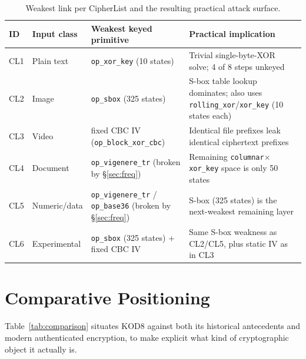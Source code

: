\documentclass[11pt]{article}
\begin{document}
\begin{table}[h]
\centering
\small
\caption{Weakest link per CipherList and the resulting practical attack surface.}
\label{tab:cl-summary}
\begin{tabular}{@{}p{1.1cm}p{3.0cm}p{4.6cm}p{4.8cm}@{}}
\toprule
\textbf{ID} & \textbf{Input class} & \textbf{Weakest keyed primitive} & \textbf{Practical implication} \\
\midrule
CL1 & Plain text & \texttt{op\_xor\_key} (10 states) & Trivial single-byte-XOR solve; 4 of 8 steps unkeyed \\
CL2 & Image & \texttt{op\_sbox} (325 states) & S-box table lookup dominates; also uses \texttt{rolling\_xor}/\texttt{xor\_key} (10 states each) \\
CL3 & Video & fixed CBC IV (\texttt{op\_block\_xor\_cbc}) & Identical file prefixes leak identical ciphertext prefixes \\
CL4 & Document & \texttt{op\_vigenere\_tr} (broken by \S\ref{sec:freq}) & Remaining \texttt{columnar}$\times$\texttt{xor\_key} space is only 50 states \\
CL5 & Numeric/data & \texttt{op\_vigenere\_tr} / \texttt{op\_base36} (broken by \S\ref{sec:freq}) & S-box (325 states) is the next-weakest remaining layer \\
CL6 & Experimental & \texttt{op\_sbox} (325 states) + fixed CBC IV & Same S-box weakness as CL2/CL5, plus static IV as in CL3 \\
\bottomrule
\end{tabular}
\end{table}

\section{Comparative Positioning}

Table~\ref{tab:comparison} situates KOD8 against both its historical
antecedents and modern authenticated encryption, to make explicit what
kind of cryptographic object it actually is.
\end{document}
